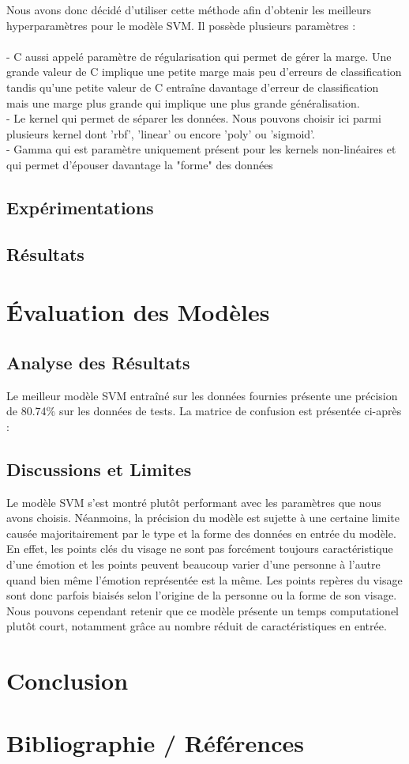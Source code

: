 \documentclass{rapport}
\begin{document}
Nous avons donc décidé d'utiliser cette méthode afin d'obtenir les meilleurs hyperparamètres pour le modèle SVM. Il possède plusieurs paramètres :\\
\\- C aussi appelé paramètre de régularisation qui permet de gérer la marge. Une grande valeur de C implique une petite marge mais peu d'erreurs de classification
tandis qu'une petite valeur de C entraîne davantage d'erreur de classification mais une marge plus grande qui implique une plus grande généralisation.\\
- Le kernel qui permet de séparer les données. Nous pouvons choisir ici parmi plusieurs kernel dont 'rbf', 'linear' ou encore
'poly' ou 'sigmoid'.\\
- Gamma qui est paramètre uniquement présent pour les kernels non-linéaires et qui permet d'épouser davantage la "forme" des données
\subsection{Expérimentations}
\subsection{Résultats}

\section{Évaluation des Modèles}
\subsection{Analyse des Résultats}

Le meilleur modèle SVM entraîné sur les données fournies présente une précision de 80.74\% sur les données de tests. La matrice de confusion est présentée ci-après :


\subsection{Discussions et Limites}

Le modèle SVM s'est montré plutôt performant avec les paramètres que nous avons choisis. Néanmoins, la précision du modèle est sujette à une certaine limite causée
majoritairement par le type et la forme des données en entrée du modèle. En effet, les points clés du visage ne sont pas forcément toujours caractéristique d'une émotion
et les points peuvent beaucoup varier d'une personne à l'autre quand bien même l'émotion représentée est la même. Les points repères du visage sont donc parfois biaisés selon
l'origine de la personne ou la forme de son visage. Nous pouvons cependant retenir que ce modèle présente un temps computationel plutôt court, notamment grâce au nombre réduit
de caractéristiques en entrée.

\section{Conclusion}

\section{Bibliographie / Références}



\end{document}
